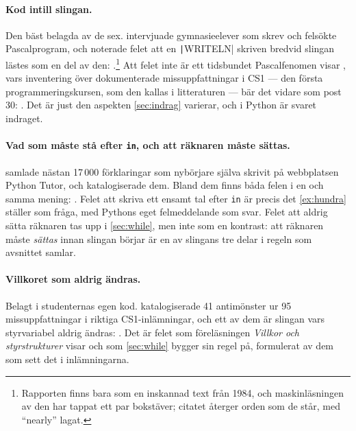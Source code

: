 \paragraph{Kod intill slingan.}  Den bäst belagda av de sex.
\textcite{Sleeman1984} intervjuade gymnasieelever som skrev och felsökte
Pascalprogram, och noterade felet att en \texttt|WRITELN| skriven
bredvid slingan lästes som en del av den:
.\footnote{Rapporten finns bara som en inskannad
  text från 1984, och maskinläsningen av den har tappat ett par bokstäver;
  citatet återger orden som de står, med \enquote{nearly} lagat.}  Att
felet inte är ett tidsbundet Pascalfenomen visar
\textcite{Sorva2012Dissertation}, vars inventering över dokumenterade
missuppfattningar i CS1 --- den första programmeringskursen, som den
kallas i litteraturen --- bär det vidare som post 30:
.
Det är just den aspekten \cref{sec:indrag} varierar, och i Python är svaret
indraget.

\paragraph{Vad som måste stå efter \texttt{in}, och att räknaren måste
sättas.}  \textcite{GuoMarkelZhang2020} samlade nästan 17\,000 förklaringar
som nybörjare själva skrivit på webbplatsen Python Tutor, och katalogiserade
dem.  Bland dem finns båda felen i en och samma mening:
.  Felet att skriva ett ensamt tal efter
\texttt{in} är precis det \cref{ex:hundra} ställer som fråga,
med Pythons eget felmeddelande som svar.  Felet att aldrig sätta räknaren
tas upp i \cref{sec:while}, men
inte som en kontrast: att räknaren måste \emph{sättas} innan slingan
börjar är en av slingans tre delar i regeln som avsnittet samlar.

\paragraph{Villkoret som aldrig ändras.}  Belagt i studenternas egen kod.
\textcite{Bosse2021Antipatterns} katalogiserade 41 antimönster ur 95
missuppfattningar i riktiga CS1-inlämningar, och ett av dem är slingan
vars styrvariabel aldrig ändras: .  Det är felet som föreläsningen \emph{Villkor och
styrstrukturer} visar och som \cref{sec:while} bygger sin regel på,
formulerat av dem som sett det i inlämningarna.

